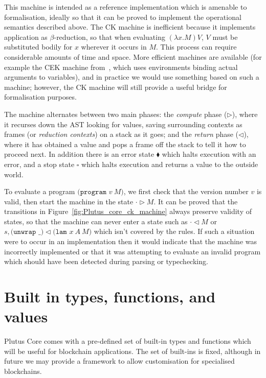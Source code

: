 \documentclass[a4paper]{article}
\begin{document}
This machine is intended as a reference implementation which is
amenable to formalisation, ideally so that it can be proved to
implement the operational semantics described above.  The CK machine
is inefficient because it implements application as $\beta$-reduction,
so that when evaluating $(\lambda x.M)V$, $V$ must be substituted
bodily for $x$ wherever it occurs in $M$.  This process can require
considerable amounts of time and space.  More efficient machines are
available (for example the CEK machine from~\cite{Felleisen-CK-CEK},
which uses environments binding actual arguments to variables), and in
practice we would use something based on such a machine; however, the
CK machine will still provide a useful bridge for formalisation
purposes.



\noindent The machine alternates between two main phases: the
\textit{compute} phase ($\triangleright$), where it recurses down
the AST looking for values, saving surrounding contexts as frames (or
\textit{reduction contexts}) on a stack as it goes; and the 
\textit{return} phase ($\triangleleft$), where it has obtained a value and
pops a frame off the stack to tell it how to proceed next.  In
addition there is an error state $\blacklozenge$ which halts execution
with an error, and a stop state $\square$ which halts execution and
returns a value to the outside world.

To evaluate a program $\texttt{(program } v\ M \texttt{)}$, we first
check that the version number $v$ is valid, then start the machine in
the state $\cdot \triangleright M$.  It can be proved that the
transitions in Figure~\ref{fig:Plutus_core_ck_machine} always preserve
validity of states, so that the machine can never enter a state such as
  $\cdot \triangleleft M$
or
$s, \texttt{(unwrap \_)} \triangleleft \texttt{(lam }x\ A \ M\texttt{)}$
which isn't covered by the rules.  If such a
situation were to occur in an implementation then it would indicate
that the machine was incorrectly implemented or that it was attempting
to evaluate an invalid program which should have been detected during
parsing or typechecking.


\section{Built in types, functions, and values}
\label{sec:builtins}
Plutus Core comes with a pre-defined set of built-in types and
functions which will be useful for blockchain applications.  The set
of built-ins is fixed, although in future we may provide a framework
to allow customisation for specialised blockchains.
\end{document}
